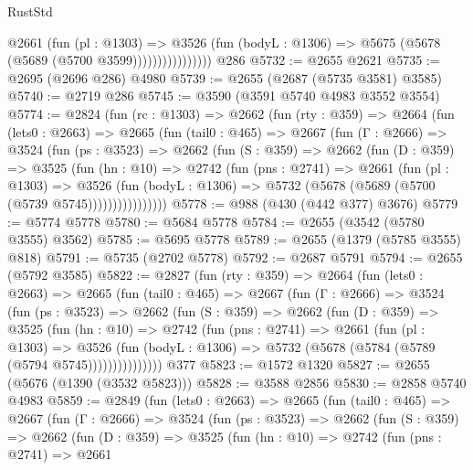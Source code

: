 \begin{lexlean}{RustStd}
\begin{coremodule}
                        @2661
                          (fun (pl : @1303) =>
                          @3526
                            (fun (bodyL : @1306) => @5675 (@5678 (@5689 (@5700 @3599))))))))))))))))
    @286
@5732 := @2655 @2621
@5735 := @2695 (@2696 @286) @4980
@5739 := @2655 (@2687 (@5735 @3581) @3585)
@5740 := @2719 @286
@5745 := @3590 (@3591 @5740 @4983 @3552 @3554)
@5774 := @2824
    (fun (rc : @1303) =>
    @2662
      (fun (rty : @359) =>
      @2664
        (fun (lets0 : @2663) =>
        @2665
          (fun (tail0 : @465) =>
          @2667
            (fun (Γ : @2666) =>
            @3524
              (fun (ps : @3523) =>
              @2662
                (fun (S : @359) =>
                @2662
                  (fun (D : @359) =>
                  @3525
                    (fun (hn : @10) =>
                    @2742
                      (fun (pns : @2741) =>
                      @2661
                        (fun (pl : @1303) =>
                        @3526
                          (fun (bodyL : @1306) =>
                          @5732 (@5678 (@5689 (@5700 (@5739 @5745))))))))))))))))
@5778 := @988 (@430 (@442 @377) @3676)
@5779 := @5774 @5778
@5780 := @5684 @5778
@5784 := @2655 (@3542 (@5780 @3555) @3562)
@5785 := @5695 @5778
@5789 := @2655 (@1379 (@5785 @3555) @818)
@5791 := @5735 (@2702 @5778)
@5792 := @2687 @5791
@5794 := @2655 (@5792 @3585)
@5822 := @2827
    (fun (rty : @359) =>
    @2664
      (fun (lets0 : @2663) =>
      @2665
        (fun (tail0 : @465) =>
        @2667
          (fun (Γ : @2666) =>
          @3524
            (fun (ps : @3523) =>
            @2662
              (fun (S : @359) =>
              @2662
                (fun (D : @359) =>
                @3525
                  (fun (hn : @10) =>
                  @2742
                    (fun (pns : @2741) =>
                    @2661
                      (fun (pl : @1303) =>
                      @3526
                        (fun (bodyL : @1306) =>
                        @5732 (@5678 (@5784 (@5789 (@5794 @5745)))))))))))))))
    @377
@5823 := @1572 @1320
@5827 := @2655 (@5676 (@1390 (@3532 @5823)))
@5828 := @3588 @2856
@5830 := @2858 @5740 @4983
@5859 := @2849
    (fun (lets0 : @2663) =>
    @2665
      (fun (tail0 : @465) =>
      @2667
        (fun (Γ : @2666) =>
        @3524
          (fun (ps : @3523) =>
          @2662
            (fun (S : @359) =>
            @2662
              (fun (D : @359) =>
              @3525
                (fun (hn : @10) =>
                @2742
                  (fun (pns : @2741) =>
                  @2661

\end{coremodule}
\end{lexlean}

